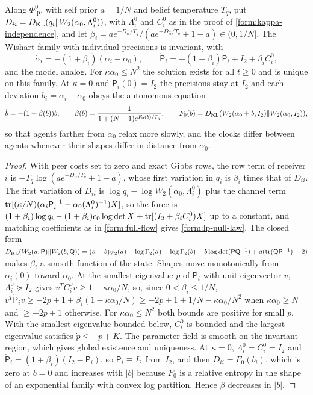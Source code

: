 Along $\Phi^0_{\mathrm{lp}}$, with self prior $a=1/N$ and belief temperature $T_q$, put $D_{ii}=D_{\mathrm{KL}}(q_i\Vert W_2(\alpha_0,\Lambda_i^0))$, with $\Lambda_i^0$ and $C_i^0$ as in the proof of \cref{form:kappa-independence}, and let $\beta_i=ae^{-D_{ii}/T_q}/(ae^{-D_{ii}/T_q}+1-a)\in(0,1/N]$. The Wishart family with individual precisions is invariant, with
\begin{equation}
 \dot\alpha_i=-(1+\beta_i)(\alpha_i-\alpha_0),\qquad
 \dot{\mathsf P}_i=-(1+\beta_i)\mathsf P_i+I_2+\beta_iC_i^0,
 \label{form:lp-null-law}
\end{equation}
and the model analog. For $\kappa\alpha_0\le N^2$ the solution exists for all $t\ge0$ and is unique on this family. At $\kappa=0$ and $\mathsf P_i(0)=I_2$ the precisions stay at $I_2$ and each deviation $b_i=\alpha_i-\alpha_0$ obeys the autonomous equation
\begin{equation}
 \dot b=-(1+\beta(b))b,\qquad
 \beta(b)=\frac{1}{1+(N-1)e^{F_0(b)/T_q}},\qquad
 F_0(b)=D_{\mathrm{KL}}(W_2(\alpha_0+b,I_2)\Vert W_2(\alpha_0,I_2)),
 \label{form:lp-null-deviation}
\end{equation}
so that agents farther from $\alpha_0$ relax more slowly, and the clocks differ between agents whenever their shapes differ in distance from $\alpha_0$.
\begin{proof}
With peer costs set to zero and exact Gibbs rows, the row term of receiver $i$ is $-T_q\log(ae^{-D_{ii}/T_q}+1-a)$, whose first variation in $q_i$ is $\beta_i$ times that of $D_{ii}$. The first variation of $D_{ii}$ is $\log q_i-\log W_2(\alpha_0,\Lambda_i^0)$ plus the channel term $\operatorname{tr}[(\kappa/N)(\alpha_i\mathsf P_i^{-1}-\alpha_0(\Lambda_i^0)^{-1})X]$, so the force is $(1+\beta_i)\log q_i-(1+\beta_i)c_0\log\det X+\operatorname{tr}[(I_2+\beta_iC_i^0)X]$ up to a constant, and matching coefficients as in \cref{form:full-flow} gives \cref{form:lp-null-law}. The closed form $D_{\mathrm{KL}}(W_2(a,\mathsf P)\Vert W_2(b,\mathsf Q))=(a-b)\psi_2(a)-\log\Gamma_2(a)+\log\Gamma_2(b)+b\log\det(\mathsf P\mathsf Q^{-1})+a(\operatorname{tr}(\mathsf Q\mathsf P^{-1})-2)$ makes $\beta_i$ a smooth function of the state. Shapes move monotonically from $\alpha_i(0)$ toward $\alpha_0$. At the smallest eigenvalue $p$ of $\mathsf P_i$ with unit eigenvector $v$, $\Lambda_i^0\succeq I_2$ gives $v^TC_i^0v\ge1-\kappa\alpha_0/N$, so, since $0<\beta_i\le1/N$, $v^T\dot{\mathsf P}_iv\ge-2p+1+\beta_i(1-\kappa\alpha_0/N)\ge-2p+1+1/N-\kappa\alpha_0/N^2$ when $\kappa\alpha_0\geq N$ and $\ge-2p+1$ otherwise. For $\kappa\alpha_0\le N^2$ both bounds are positive for small $p$. With the smallest eigenvalue bounded below, $C_i^0$ is bounded and the largest eigenvalue satisfies $\dot p\le-p+K$. The parameter field is smooth on the invariant region, which gives global existence and uniqueness. At $\kappa=0$, $\Lambda_i^0=C_i^0=I_2$ and $\dot{\mathsf P}_i=(1+\beta_i)(I_2-\mathsf P_i)$, so $\mathsf P_i\equiv I_2$ from $I_2$, and then $D_{ii}=F_0(b_i)$, which is zero at $b=0$ and increases with $|b|$ because $F_0$ is a relative entropy in the shape of an exponential family with convex log partition. Hence $\beta$ decreases in $|b|$.
\end{proof}

